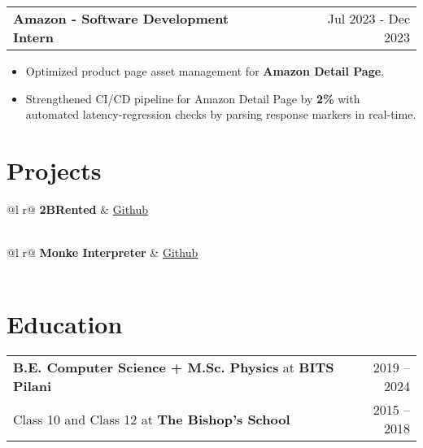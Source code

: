 \documentclass[a4paper,12pt]{article}
\makeatletter
\newenvironment{joblong}[2]
    {
    \begin{tabularx}{\linewidth}{@{}l X r@{}}
    \textbf{#1} & \hfill &  #2 \\[3.75pt]
    \end{tabularx}
    \begin{minipage}[t]{\linewidth}
    \begin{itemize}[nosep, leftmargin=1em, itemsep=1pt,label=--]
    }
    {
    \end{itemize}
    \end{minipage}    
    }
\makeatother
\begin{document}
\begin{joblong}{Amazon - Software Development Intern}{Jul 2023 - Dec 2023}
\item Optimized product page asset management for \textbf{Amazon Detail Page}.
\item Strengthened CI/CD pipeline for Amazon Detail Page by \textbf{2\%} with automated latency-regression checks by parsing response markers in real-time.
\end{joblong}
\vspace{-2mm}

\section{Projects}

\begin{tabularx}{\linewidth}{ @{}l r@{} }
\textbf{2BRented} & \hfill \href{https://github.com/nameetrajore/2BRented}{Github} \\[3.75pt]
 \\
\end{tabularx}
\vspace{-2mm}

\begin{tabularx}{\linewidth}{ @{}l r@{} }
\textbf{Monke Interpreter} & \hfill \href{https://github.com/nameetrajore/monke-interpreter}{Github} \\[3.75pt]
 \\
\end{tabularx}
\vspace{-2mm}

\section{Education}
\begin{tabularx}{\linewidth}{@{}X r@{}}
\textbf{B.E. Computer Science + M.Sc. Physics} at \textbf{BITS Pilani} & 2019 -- 2024 \\

Class 10 and Class 12 at \textbf{The Bishop's School} & 2015 -- 2018 \\
\end{tabularx}
\vspace{-2mm}
\end{document}
